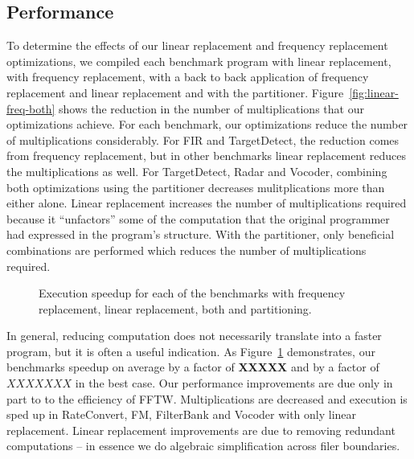 \subsection{Performance}
To determine the effects of our linear replacement and frequency
replacement optimizations, we compiled each benchmark program with
linear replacement, with frequency replacement, with a back to back application of
frequency replacement and linear replacement and with the partitioner.
Figure~\ref{fig:linear-freq-both} shows the reduction in the number
of multiplications that our optimizations achieve.
For each benchmark, our optimizations reduce the number of multiplications
considerably. For FIR and TargetDetect, the reduction comes from 
frequency replacement, but in other benchmarks linear replacement
reduces the multiplications as well. For TargetDetect, Radar and Vocoder,
combining both optimizations using the partitioner decreases mulitplications
more than either alone. Linear replacement increases the number of multiplications
required because it ``unfactors'' some of the computation that the original
programmer had expressed in the program's structure. With the partitioner,
only beneficial combinations are performed which reduces the number of 
multiplications required.

\begin{figure}[t]
\center
\epsfxsize=3.2in
\vspace{-6pt}
\caption{Execution speedup for each of the benchmarks with 
  frequency replacement, linear replacement, both and partitioning.}
\label{fig:execution-speedup}
\vspace{-6pt}
\end{figure}

In general, reducing computation does not necessarily translate into a
faster program, but it is often a useful indication.  As
Figure~\ref{fig:execution-speedup} demonstrates, our benchmarks
speedup on average by a factor of {\bf XXXXX} and by a factor of
$XXXXXXX$ in the best case.  Our performance improvements are due only
in part to to the efficiency of FFTW.  Multiplications are decreased
and execution is sped up in RateConvert, FM, FilterBank and Vocoder
with only linear replacement. Linear replacement improvements are due
to removing redundant computations -- in essence we do algebraic
simplification across filer boundaries.

